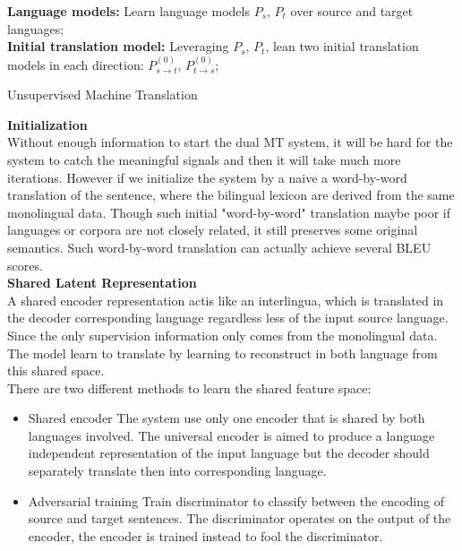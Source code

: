 \begin{algorithm}[H]
	\SetAlgoLined
	\textbf{Language models:} Learn language models $P_s$, $P_t$ over source and target languages;\\
	\textbf{Initial translation model:}  Leveraging $P_s$, $P_t$, lean two initial translation models in each direction: $P_{s\rightarrow t}^{(0)}$, ${P_{t \rightarrow s}^{(0)}}$;\\
	\caption{Unsupervised Machine Translation}
\end{algorithm}


\textbf{Initialization}\\
Without enough information to start the dual MT system, it will be hard for the system to catch the meaningful signals and then it will take much more iterations. However if we initialize the system by a naive a word-by-word translation of the sentence, where the bilingual lexicon are derived from the same monolingual data. Though such initial "word-by-word" translation maybe poor if languages or corpora are not closely related, it still preserves some  original semantics. Such word-by-word translation can actually achieve several BLEU scores.\\


\textbf{Shared Latent Representation} \\
A shared encoder representation actis like an interlingua, which is translated in the decoder corresponding language regardless less of the input source language. Since the only supervision information only comes from the monolingual data. The model learn to translate by learning to reconstruct in both language from this shared space.\\
There are two different methods to learn the shared feature space:
\begin{itemize}
	\item Shared encoder
	The system use only one encoder that is shared by both languages involved. The universal encoder is aimed to produce a language independent representation of the input language but the decoder should separately translate then into corresponding language.
	\item Adversarial training
	Train discriminator to classify between the encoding of source and target sentences. The discriminator operates on the output of the encoder, the encoder is trained instead to fool the discriminator. 
\end{itemize}



